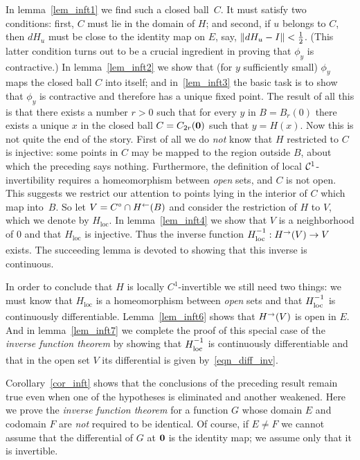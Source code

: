 In lemma~\ref{lem_inft1} we find such a closed ball~$C$.  It must satisfy two conditions:
first, $C$ must lie in the domain of $H$; and second, if $u$ belongs to $C$, then $dH_u$ must
be close to the identity map on $E$, say, $\lVert dH_u - I\rVert < \frac12$.  (This latter condition
turns out to be a crucial ingredient in proving that $\phi_y$ is contractive.)  In
lemma~\ref{lem_inft2} we show that (for $y$ sufficiently small) $\phi_y$ maps the closed ball
$C$ into itself; and in~\ref{lem_inft3} the basic task is to show that $\phi_y$ is contractive
and therefore has a unique fixed point. The result of all this is that there exists a number
$r > 0$ such that for every $y$ in $B = B_r(0)$ there exists a unique $x$ in the closed ball
$C = C_{2r}(\mathbf{0})$ such that $y = H(x)$. Now this is not quite the end of the story.  First
of all we do \emph{not} know that $H$ restricted to $C$ is injective: some points in $C$ may
be mapped to the region outside $B$, about which the preceding says nothing. Furthermore, the
definition of local $\mathcal{C}^1$-invertibility requires a homeomorphism between \emph{open}
sets, and $C$ is not open.  This suggests we restrict our attention to points lying in the
interior of $C$ which map into~$B$.  So let $V = C^{\circ} \cap H^{\gets}(B)$ and consider the
restriction of $H$ to $V$, which we denote by $H_{\text{loc}}$.  In lemma~\ref{lem_inft4} we
show that $V$ is a neighborhood of $0$ and that $H_{\text{loc}}$ is injective.  Thus the
inverse function $H_{\mathstrut\text{loc}}^{\mathstrut{-1}}: H^{\rightarrow}(V) \rightarrow V$ exists.  The succeeding lemma is devoted to
showing that this inverse is continuous.

In order to conclude that $H$ is locally $C^1$-invertible we still need two things: we must
know that $H_{\text{loc}}$ is a homeomorphism between \emph{open} sets and that $H_{\mathstrut\text{loc}}^{\mathstrut{-1}}$ is
continuously differentiable.  Lemma~\ref{lem_inft6} shows that $H^{\rightarrow}(V)$ is open in $E$.
And in lemma~\ref{lem_inft7} we complete the proof of this special case of the \emph{inverse
function theorem} by showing that $H_{\mathstrut\text{loc}}^{\mathstrut{-1}}$ is continuously differentiable and that in the
open set $V$ its differential is given by~\eqref{eqn_diff_inv}.

Corollary~\ref{cor_inft} shows that the conclusions of the preceding result remain true even
when one of the hypotheses is eliminated and another weakened.  Here we prove the
\emph{inverse function theorem} for a function $G$ whose domain $E$ and codomain $F$ are
\emph{not} required to be identical.  Of course, if $E \ne F$ we cannot assume that the
differential of $G$ at $\mathbf{0}$ is the identity map; we assume only that it is invertible.

